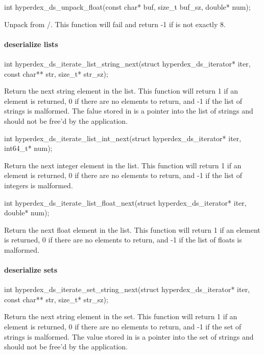 \begin{ccode}
int hyperdex_ds_unpack_float(const char* buf, size_t buf_sz, double* num);
\end{ccode}
\funcdesc Unpack  from /.  This function will
fail and return -1 if  is not exactly \unit{8}{\byte}.

\paragraph{deserialize lists}

\begin{ccode}
int hyperdex_ds_iterate_list_string_next(struct hyperdex_ds_iterator* iter,
                                         const char** str, size_t* str_sz);
\end{ccode}
\funcdesc Return the next string element in the list.  This function will return
1 if an element is returned, 0 if there are no elements to return, and -1 if the
list of strings is malformed.  The falue stored in  is a pointer into
the list of strings and should not be free'd by the application.

\funcsep
\begin{ccode}
int hyperdex_ds_iterate_list_int_next(struct hyperdex_ds_iterator* iter, int64_t* num);
\end{ccode}
\funcdesc Return the next integer element in the list.  This function will
return 1 if an element is returned, 0 if there are no elements to return, and -1
if the list of integers is malformed.

\funcsep
\begin{ccode}
int hyperdex_ds_iterate_list_float_next(struct hyperdex_ds_iterator* iter, double* num);
\end{ccode}
\funcdesc Return the next float element in the list.  This function will return
1 if an element is returned, 0 if there are no elements to return, and -1 if the
list of floats is malformed.

\paragraph{deserialize sets}

\begin{ccode}
int hyperdex_ds_iterate_set_string_next(struct hyperdex_ds_iterator* iter,
                                        const char** str, size_t* str_sz);
\end{ccode}
\funcdesc Return the next string element in the set.  This function will return
1 if an element is returned, 0 if there are no elements to return, and -1 if the
set of strings is malformed.  The value stored in  is a pointer into
the set of strings and should not be free'd by the application.

